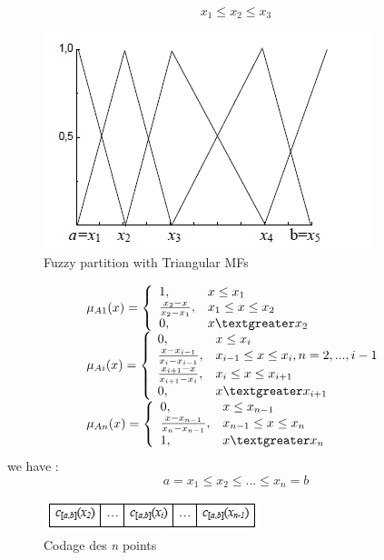 \documentclass[runningheads,a4paper]{llncs}
\begin{document}
\begin{equation}\label{key}
x_{1} \leq x_{2} \leq x_{3}
\end{equation}

\begin{figure}[!h]
	\begin{center}
		\includegraphics[scale=0.95]{fig/vl}
		\caption {Fuzzy partition with Triangular MFs}
		\label{vl} 
	\end{center}
\end{figure}

\begin{equation} 
\begin{tabular}{l}
$\mu_{A1}(x) =  \left \{
\begin{array}{ll}   %
1,& x \leq x_{1}\\
\frac{x_{2} - x}{x_{2} - x_{1}},& x_{1} \leq x \leq x_{2}\\
0        , &x \textgreater x_{2}
\end{array} 
\right. $	\\
$\mu_{Ai}(x)= \left \{
\begin{array}{ll}
0, &x \leq x_{i}\\
\frac{x - x_{i-1}}{x_{i} - x_{i-1}},& x_{i-1} \leq x \leq x_{i},n=2,...,i-1\\
\frac{x_{i+1} - x}{x_{i+1} - x_{i}}, & x_{i} \leq x \leq x_{i+1}\\
0        , &x \textgreater x_{i+1}
\end{array}
\right.	$	\\		
$\mu_{An}(x)= \left \{
\begin{array}{ll}
0, &x \leq x_{n-1}\\
\frac{x - x_{n-1}}{x_{n} - x_{n-1}},& x_{n-1} \leq x \leq x_{n}\\
1        , &x \textgreater x_{n}\\
\end{array}
\right.$
\end{tabular}
\end{equation}
we have :
\[ \textit{a} = x_{1} \leq x_{2} \leq ...\leq x_{n} = \textit{b} \]
\begin{figure}[!h] 
	\begin{center}
		\includegraphics[scale=0.95]{fig/cotr}
		\caption {Codage des \textit{n} points}
		\label{cotr}
	\end{center}
\end{figure}
\end{document}
